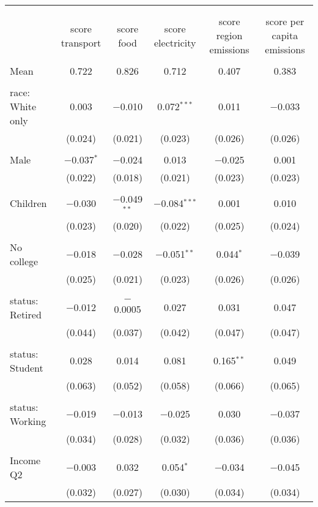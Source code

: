 
\begin{tabular}{@{\extracolsep{5pt}}lccccc} 
\\[-1.8ex]\hline 
\hline \\[-1.8ex] 
\\[-1.8ex] & score transport & score food & score electricity & score region emissions & score per capita emissions \\ 
\hline \\[-1.8ex] 
 Mean & 0.722 & 0.826 & 0.712 & 0.407 & 0.383  \\ \hline \\[-1.8ex] race: White only & 0.003 & $-$0.010 & 0.072$^{***}$ & 0.011 & $-$0.033 \\ 
  & (0.024) & (0.021) & (0.023) & (0.026) & (0.026) \\ 
  & & & & & \\ 
 Male & $-$0.037$^{*}$ & $-$0.024 & 0.013 & $-$0.025 & 0.001 \\ 
  & (0.022) & (0.018) & (0.021) & (0.023) & (0.023) \\ 
  & & & & & \\ 
 Children & $-$0.030 & $-$0.049$^{**}$ & $-$0.084$^{***}$ & 0.001 & 0.010 \\ 
  & (0.023) & (0.020) & (0.022) & (0.025) & (0.024) \\ 
  & & & & & \\ 
 No college & $-$0.018 & $-$0.028 & $-$0.051$^{**}$ & 0.044$^{*}$ & $-$0.039 \\ 
  & (0.025) & (0.021) & (0.023) & (0.026) & (0.026) \\ 
  & & & & & \\ 
 status: Retired & $-$0.012 & $-$0.0005 & 0.027 & 0.031 & 0.047 \\ 
  & (0.044) & (0.037) & (0.042) & (0.047) & (0.047) \\ 
  & & & & & \\ 
 status: Student & 0.028 & 0.014 & 0.081 & 0.165$^{**}$ & 0.049 \\ 
  & (0.063) & (0.052) & (0.058) & (0.066) & (0.065) \\ 
  & & & & & \\ 
 status: Working & $-$0.019 & $-$0.013 & $-$0.025 & 0.030 & $-$0.037 \\ 
  & (0.034) & (0.028) & (0.032) & (0.036) & (0.036) \\ 
  & & & & & \\ 
 Income Q2 & $-$0.003 & 0.032 & 0.054$^{*}$ & $-$0.034 & $-$0.045 \\ 
  & (0.032) & (0.027) & (0.030) & (0.034) & (0.034) \\ 

\end{tabular}
